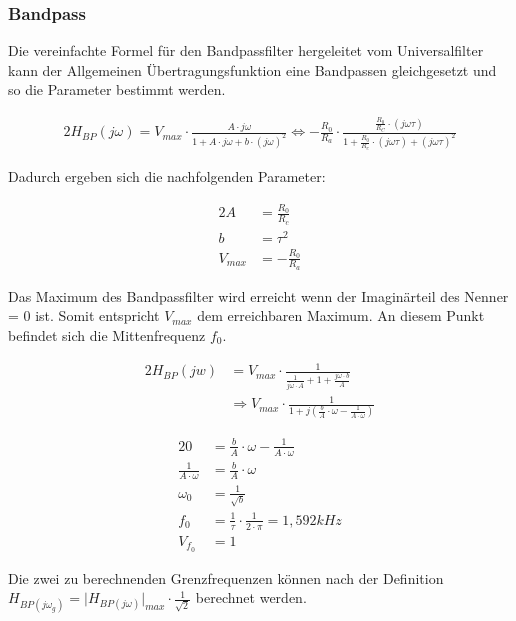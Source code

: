 \newpage

\subsubsection{Bandpass}

Die vereinfachte Formel für den Bandpassfilter hergeleitet vom Universalfilter kann der Allgemeinen Übertragungsfunktion eine Bandpassen gleichgesetzt und so die Parameter bestimmt werden.


\begin{alignat}{2}
H_{BP}(j\omega) = V_{max} \cdot \frac{A \cdot j\omega}{1 + A \cdot j \omega + b \cdot (j\omega)^2} \Longleftrightarrow - \frac{R_{0}}{R_{a}} \cdot \frac{\frac{R_{0}}{R_{C}} \cdot (j\omega \tau)}{1 + \frac{R_{0}}{R_{c}} \cdot (j\omega \tau) + (j\omega \tau)^2}
\end{alignat}

Dadurch ergeben sich die nachfolgenden Parameter:

\begin{alignat}{2}
A &= \frac{R_{0}}{R_{c}}\\
b &= \tau^2\\
V_{max} &= - \frac{R_{0}}{R_{a}}
\end{alignat}

\noindent Das Maximum des Bandpassfilter wird erreicht wenn der Imaginärteil des Nenner = 0 ist. Somit entspricht $V_{max}$ dem erreichbaren Maximum. An diesem Punkt befindet sich die Mittenfrequenz $f_{0}$. 

\begin{alignat}{2}
H_{BP}(jw) &= V_{max} \cdot \frac{1}{\frac{1}{j\omega \cdot A} + 1 + \frac{j\omega \cdot b }{A}}\\
&\Rightarrow V_{max} \cdot \frac{1}{1 + j \left(\frac{b}{A}\cdot \omega - \frac{1}{A \cdot \omega} \right)}
\end{alignat}

\begin{alignat}{2}
	0 &= \frac{b}{A} \cdot \omega - \frac{1}{A \cdot \omega}\\
	\frac{1}{A \cdot \omega} &= \frac{b}{A} \cdot \omega\\
	\omega_{0} &= \frac{1}{\sqrt{b}}\\
	f_{0} &= \frac{1}{\tau} \cdot \frac{1}{2 \cdot \pi} = 1,592 kHz\\
	V_{f_{0}} &= 1
\end{alignat}

\noindent Die zwei zu berechnenden Grenzfrequenzen können nach der Definition $H_{BP (j \omega_{g})} = \lvert H_{BP (j \omega)} \rvert_{max} \cdot \frac{1}{\sqrt{2}}$ berechnet werden.


